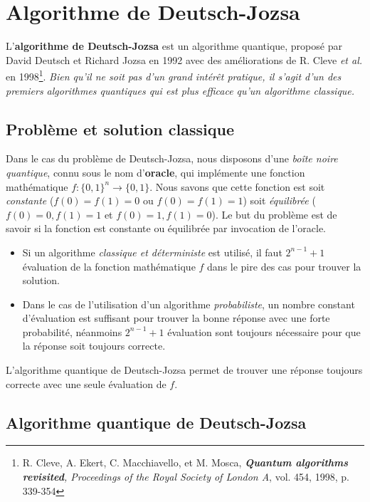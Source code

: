 \section{Algorithme de Deutsch-Jozsa}
\label{sec:DeutJ}

L'\textbf{algorithme de Deutsch-Jozsa} est un algorithme quantique, proposé
par David Deutsch et Richard Jozsa en 1992 avec des améliorations de R. Cleve
\emph{et al.} en 1998\footnote{R. Cleve, A. Ekert, C. Macchiavello, et M.
Mosca, \emph{\textbf{Quantum algorithms revisited}, Proceedings of the Royal
Society of London A}, vol. 454, 1998, p. 339-354}. \emph{Bien qu'il ne soit
pas d'un grand intérêt pratique, il s'agit d'un des premiers algorithmes
quantiques qui est plus efficace qu'un algorithme classique.}

\subsection{Problème et solution classique}

Dans le cas du problème de Deutsch-Jozsa, nous disposons d'une \emph{boîte
noire quantique}, connu sous le nom d'\textbf{oracle}, qui implémente une
fonction mathématique $f:\{0,1\}^n\rightarrow\{0,1\}$. Nous savons que cette
fonction est soit \emph{constante} ($f(0)=f(1)=0$ ou $f(0)=f(1)=1$) soit
\emph{équilibrée} ($f(0)=0,f(1)=1$ et $f(0)=1,f(1)=0$). Le but du problème est
de savoir si la fonction est constante ou équilibrée par invocation de l'oracle.

\begin{itemize}
\item Si un algorithme \emph{classique et déterministe} est utilisé, il faut
$2^{n-1}+1$ évaluation de la fonction mathématique $f$ dans le pire des cas
pour trouver la solution.

\item Dans le cas de l'utilisation d'un algorithme \emph{probabiliste}, un
nombre constant d'évaluation est suffisant pour trouver la bonne réponse avec
une forte probabilité, néanmoins $2^{n-1}+1$ évaluation sont toujours
nécessaire pour que la réponse soit toujours correcte.
\end{itemize}

L'algorithme quantique de Deutsch-Jozsa permet de trouver une réponse toujours
correcte avec une seule évaluation de $f$.


\subsection{Algorithme quantique de Deutsch-Jozsa}

